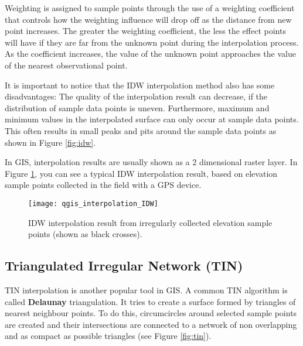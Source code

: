 Weighting is assigned to sample points through the use of a weighting
coefficient that controls how the weighting influence will drop off as the
distance from new point increases. The greater the weighting coefficient, the
less the effect points will have if they are far from the unknown point
during the interpolation process. As the coefficient increases, the value of
the unknown point approaches the value of the nearest observational point. 

It is important to notice that the IDW interpolation method also has some
disadvantages: The quality of the interpolation result can decrease, if the
distribution of sample data points is uneven. Furthermore, maximum and
minimum values in the interpolated surface can only occur at sample data
points. This often results in small peaks and pits around the sample data
points as shown in Figure \ref{fig:idw}.

In GIS, interpolation results are usually shown as a 2 dimensional raster
layer. In Figure \ref{fig:qgisidw}, you can see a typical IDW interpolation
result, based on elevation sample points collected in the field with a GPS
device.

\begin{figure}[ht]
   \begin{center}
   \caption{IDW interpolation result from irregularly collected elevation
sample points (shown as black crosses).}
\label{fig:qgisidw}\smallskip
   \texttt{[image: qgis\_interpolation\_IDW]}
\end{center}
\end{figure}

\subsection{Triangulated Irregular Network (TIN)}

TIN interpolation is another popular tool in GIS. A common TIN algorithm is
called \textbf{Delaunay} triangulation. It tries to create a surface formed by
triangles of nearest neighbour points. To do this, circumcircles around
selected sample points are created and their intersections are connected to a
network of non overlapping and as compact as possible triangles (see Figure
\ref{fig:tin}).

